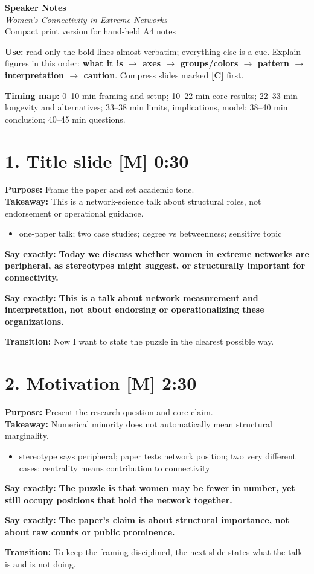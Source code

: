 \documentclass[11pt,a4paper]{article}
\newcommand{\slide}[4]{%
\section*{#1 \hfill {\normalsize #2}}
\textbf{Purpose:} #3\\
\textbf{Takeaway:} #4
}
\newcommand{\boldline}[1]{\par\textbf{Say exactly:} \textbf{#1}}
\newcommand{\transition}[1]{\par\textbf{Transition:} #1}
\newcommand{\labelbox}[1]{\textbf{[#1]}}
\begin{document}
\begin{center}
{\LARGE \textbf{Speaker Notes}}\\
\vspace{2mm}
{\large \textit{Women’s Connectivity in Extreme Networks}}\\
\vspace{1mm}
Compact print version for hand-held A4 notes
\end{center}

\noindent\textbf{Use:} read only the bold lines almost verbatim; everything else is a cue. Explain figures in this order: \textbf{what it is $\rightarrow$ axes $\rightarrow$ groups/colors $\rightarrow$ pattern $\rightarrow$ interpretation $\rightarrow$ caution}. Compress slides marked \labelbox{C} first.

\medskip
\noindent\textbf{Timing map:} 0--10 min framing and setup; 10--22 min core results; 22--33 min longevity and alternatives; 33--38 min limits, implications, model; 38--40 min conclusion; 40--45 min questions.

\slide{1. Title slide \labelbox{M}}{0:30}{Frame the paper and set academic tone.}{This is a network-science talk about structural roles, not endorsement or operational guidance.}
\begin{itemize}
\item one-paper talk; two case studies; degree vs betweenness; sensitive topic
\end{itemize}
\boldline{Today we discuss whether women in extreme networks are peripheral, as stereotypes might suggest, or structurally important for connectivity.}
\boldline{This is a talk about network measurement and interpretation, not about endorsing or operationalizing these organizations.}
\transition{Now I want to state the puzzle in the clearest possible way.}

\slide{2. Motivation \labelbox{M}}{2:30}{Present the research question and core claim.}{Numerical minority does not automatically mean structural marginality.}
\begin{itemize}
\item stereotype says peripheral; paper tests network position; two very different cases; centrality means contribution to connectivity
\end{itemize}
\boldline{The puzzle is that women may be fewer in number, yet still occupy positions that hold the network together.}
\boldline{The paper’s claim is about structural importance, not about raw counts or public prominence.}
\transition{To keep the framing disciplined, the next slide states what the talk is and is not doing.}
\end{document}
